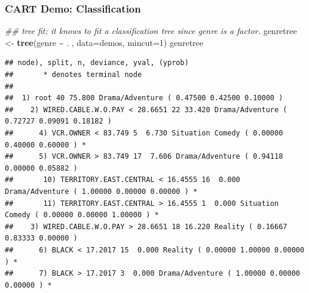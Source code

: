 \documentclass[
  shownotes,
  xcolor={svgnames},
  hyperref={colorlinks,citecolor=DarkBlue,linkcolor=DarkRed,urlcolor=DarkBlue}
  ]{beamer}
\newenvironment{Shaded}{\begin{snugshade}}{\end{snugshade}}
\newcommand{\CommentTok}[1]{\textcolor[rgb]{0.56,0.35,0.01}{\textit{#1}}}
\newcommand{\DataTypeTok}[1]{\textcolor[rgb]{0.13,0.29,0.53}{#1}}
\newcommand{\DecValTok}[1]{\textcolor[rgb]{0.00,0.00,0.81}{#1}}
\newcommand{\KeywordTok}[1]{\textcolor[rgb]{0.13,0.29,0.53}{\textbf{#1}}}
\newcommand{\NormalTok}[1]{#1}
\newcommand{\OperatorTok}[1]{\textcolor[rgb]{0.81,0.36,0.00}{\textbf{#1}}}
\newcommand{\StringTok}[1]{\textcolor[rgb]{0.31,0.60,0.02}{#1}}
\begin{document}
\begin{frame}[fragile]
\frametitle{CART Demo: Classification}

\begin{scriptsize}
\begin{Shaded}
\begin{Highlighting}[]
\CommentTok{\#\# tree fit; it knows to fit a classification tree since genre is a factor.}
\NormalTok{genretree \textless{}{-}}\StringTok{ }\KeywordTok{tree}\NormalTok{(genre }\OperatorTok{\textasciitilde{}}\StringTok{ }\NormalTok{. , }\DataTypeTok{data=}\NormalTok{demos, }\DataTypeTok{mincut=}\DecValTok{1}\NormalTok{)}
\NormalTok{genretree}
\end{Highlighting}
\end{Shaded}
\end{scriptsize}

\begin{tiny}
\begin{verbatim}
## node), split, n, deviance, yval, (yprob)
##       * denotes terminal node
## 
##  1) root 40 75.800 Drama/Adventure ( 0.47500 0.42500 0.10000 )  
##    2) WIRED.CABLE.W.O.PAY < 28.6651 22 33.420 Drama/Adventure ( 0.72727 0.09091 0.18182 )  
##      4) VCR.OWNER < 83.749 5  6.730 Situation Comedy ( 0.00000 0.40000 0.60000 ) *
##      5) VCR.OWNER > 83.749 17  7.606 Drama/Adventure ( 0.94118 0.00000 0.05882 )  
##       10) TERRITORY.EAST.CENTRAL < 16.4555 16  0.000 Drama/Adventure ( 1.00000 0.00000 0.00000 ) *
##       11) TERRITORY.EAST.CENTRAL > 16.4555 1  0.000 Situation Comedy ( 0.00000 0.00000 1.00000 ) *
##    3) WIRED.CABLE.W.O.PAY > 28.6651 18 16.220 Reality ( 0.16667 0.83333 0.00000 )  
##      6) BLACK < 17.2017 15  0.000 Reality ( 0.00000 1.00000 0.00000 ) *
##      7) BLACK > 17.2017 3  0.000 Drama/Adventure ( 1.00000 0.00000 0.00000 ) *
\end{verbatim}
\end{tiny}
\end{frame}
\end{document}
